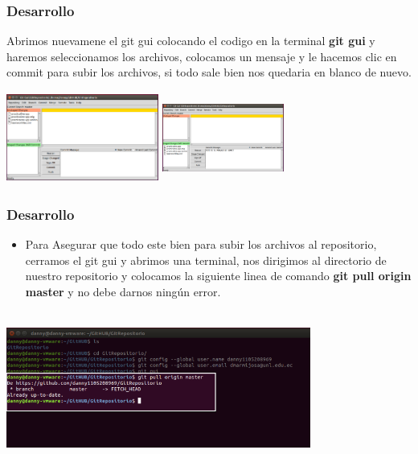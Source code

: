 \documentclass[8pt]{beamer}
\begin{document}
\begin{frame}
\frametitle{Desarrollo}
\setlength{\parskip}{00pt}
Abrimos nuevamene el git gui colocando el codigo en la terminal \textbf{git gui} y haremos seleccionamos los archivos, colocamos un mensaje y le hacemos clic en commit para subir los archivos, si todo sale bien nos quedaria en blanco de nuevo. 
\begin{center}

\setlength{\parskip}{08pt}
\includegraphics[width=5cm, height=3cm]{img/dieciseis} \hspace{0.5cm}
\includegraphics[width=4cm, height=3cm]{img/diecisiete}
\end{center}
\end{frame}


\begin{frame}
\frametitle{Desarrollo}
\setlength{\parskip}{03pt}
\begin{center}
\begin{itemize}
\justifying
\item{Para Asegurar que todo este bien para subir los archivos al repositorio, cerramos el git gui y abrimos una terminal, nos dirigimos al directorio de nuestro repositorio y colocamos la siguiente linea de comando \textbf{git pull origin master} y no debe darnos ningún error.}\end{itemize} 
\setlength{\parskip}{08pt}
\includegraphics[width=10cm, height=5cm]{img/dieciocho}
\end{center}
\end{frame}
\end{document}
